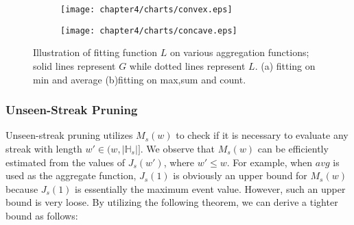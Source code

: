 \begin{figure}
	\centering
    \begin{subfigure}[b]{0.45\textwidth}
        \texttt{[image: chapter4/charts/convex.eps]}
        \caption{}
    \end{subfigure}
    \begin{subfigure}[b]{0.45\textwidth}
        \texttt{[image: chapter4/charts/concave.eps]}
        \caption{}
    \end{subfigure}
    \caption{Illustration of fitting function $L$ on various aggregation functions; solid lines represent $G$ while dotted lines represent $L$. (a) fitting on min and average (b)fitting on max,sum and count.}
    \label{fig:convex_exp}
\end{figure}


\subsubsection{Unseen-Streak Pruning}
\label{sec:useen-window-bound}
Unseen-streak pruning utilizes $M_s(w)$ to check if it is necessary to evaluate any 
streak with length $w' \in (w,|\mathbb{H}_s|]$. We observe that $M_s(w)$ can
be efficiently estimated from the values of $J_s(w')$, where $w'\leq w$. 
For example, when $avg$ is used as the aggregate function, $J_s(1)$ is obviously an upper bound for $M_s(w)$ because $J_s(1)$ is essentially the maximum event value. However, such an upper bound is very loose. By utilizing the following theorem, we can derive a tighter bound as follows:

